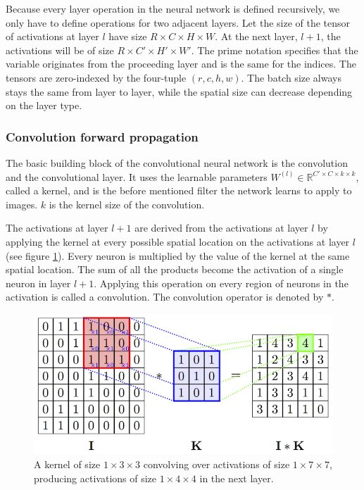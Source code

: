 \documentclass[a4paper,11pt,twoside]{article}
\begin{document}
Because every layer operation in the neural network is defined recursively, we only have to define operations for two adjacent layers. Let the size of the tensor of activations at layer $l$ have size $R \times C \times H \times W$. At the next layer, $l+1$, the activations will be of size $R \times C' \times H' \times W'$. The prime notation specifies that the variable originates from the proceeding layer and is the same for the indices. The tensors are zero-indexed by the four-tuple $(r, c, h, w)$. The batch size always stays the same from layer to layer, while the spatial size can decrease depending on the layer type. \cite{cs231n} \cite{convmath}

\subsubsection{Convolution forward propagation}
The basic building block of the convolutional neural network is the convolution and the convolutional layer. It uses the learnable parameters $W^{(l)} \in \mathbb{R}^{C' \times C  \times k \times k}$, called a kernel, and is the before mentioned filter the network learns to apply to images. $k$ is the kernel size of the convolution. \cite{cs231n}

The activations at layer $l+1$ are derived from the activations at layer $l$ by applying the kernel at every possible spatial location on the activations at layer $l$ (see figure \ref{figkonv}). Every neuron is multiplied by the value of the kernel at the same spatial location. The sum of all the products become the activation of a single neuron in layer $l+1$. Applying this operation on every region of neurons in the activation is called a convolution. The convolution operator is denoted by $*$. \cite{cs231n} \cite{convmath} \cite{convarithmetic}

\begin{figure}[h]
	\centering
  		\includegraphics[scale=2.1]{convolution.png}
  	\caption{A kernel of size $1 \times 3 \times 3$ convolving over activations of size $1 \times 7 \times 7$, producing activations of size $1 \times 4 \times 4$ in the next layer. \cite{figkonv}} \label{figkonv}
\end{figure}
\end{document}
